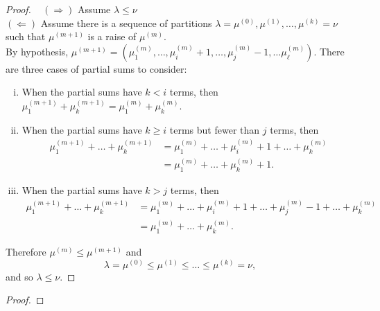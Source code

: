 \documentclass{article}
\newenvironment{problem}[2][Problem]{\begin{trivlist}
\item[\hskip \labelsep {\bfseries #1}\hskip \labelsep {\bfseries #2.}]}{\end{trivlist}}
\begin{document}
\begin{proof} ~
  $(\Longrightarrow)$ Assume $\lambda \leq \nu$
  \\
  $(\Longleftarrow)$
  Assume there is a sequence of partitions
  $\lambda = \mu^{(0)}, \mu^{(1)}, \hdots, \mu^{(k)} = \nu$ such that
  $\mu^{(m+1)}$ is a raise of $\mu^{(m)}$.
  \\
  By hypothesis,
  $\mu^{(m+1)} = (\mu^{(m)}_1, \hdots, \mu^{(m)}_i + 1, \hdots, \mu^{(m)}_j - 1, \hdots \mu^{(m)}_\ell)$.
  There are three cases of partial sums to consider:
  \begin{enumerate}[(i)]
    \item When the partial sums have $k < i$ terms, then
    $\mu^{(m+1)}_1 + \mu^{(m+1)}_k = \mu^{(m)}_1 + \mu^{(m)}_k$.
    \item When the partial sums have $k \geq i$ terms but fewer than $j$ terms, then
    \begin{align*}
      \mu^{(m+1)}_1 + \hdots + \mu^{(m+1)}_k
      &= \mu^{(m)}_1 + \hdots + \mu^{(m)}_i + 1 + \hdots + \mu^{(m)}_k \\
      &= \mu^{(m)}_1 + \hdots + \mu^{(m)}_k + 1.
    \end{align*}
    \item When the partial sums have $k > j$ terms, then
    \begin{align*}
      \mu^{(m+1)}_1 + \hdots + \mu^{(m+1)}_k
      &= \mu^{(m)}_1 + \hdots + \mu^{(m)}_i + 1 + \hdots + \mu^{(m)}_j - 1 + \hdots + \mu^{(m)}_k \\
      &= \mu^{(m)}_1 + \hdots + \mu^{(m)}_k.
    \end{align*}
  \end{enumerate}
  Therefore $\mu^{(m)} \leq \mu^{(m + 1)}$ and \[
    \lambda = \mu^{(0)} \leq \mu^{(1)} \leq \hdots \leq \mu^{(k)} = \nu,
  \] and so $\lambda \leq \nu$.
\end{proof}
\pagebreak
\begin{problem}{3}
\end{problem}

\begin{proof}
\end{proof}
\begin{problem}{4}
\end{problem}
\end{document}
